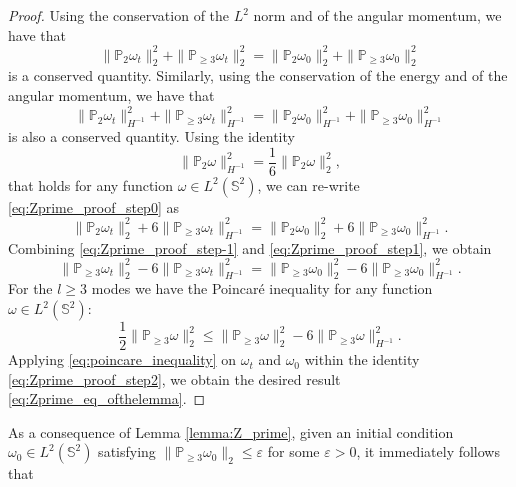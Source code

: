 \documentclass{amsart}
\def\esse{{\mathbb{S}}}
\begin{document}
\begin{proof}
    Using the conservation of the $L^2$ norm and of the angular momentum, we have that 
    \begin{equation}\label{eq:Zprime_proof_step-1}
        \|\mathbb{P}_2\omega_t\|_2^2+\|\mathbb{P}_{\geq3}\omega_t\|_2^2=\|\mathbb{P}_2\omega_0\|_2^2+\|\mathbb{P}_{\geq3}\omega_0\|_2^2
    \end{equation}
    is a conserved quantity.
    Similarly, using the conservation of the energy and of the angular momentum, we have that
    \begin{equation}\label{eq:Zprime_proof_step0}
        \|\mathbb{P}_2\omega_t\|^2_{H^{-1}}+\|\mathbb{P}_{\geq3}\omega_t\|^2_{H^{-1}}=\|\mathbb{P}_2\omega_0\|^2_{H^{-1}}+\|\mathbb{P}_{\geq3}\omega_0\|^2_{H^{-1}}
    \end{equation}
    is also a conserved quantity.
    Using the identity
    \begin{equation*}
        \|\mathbb{P}_2\omega\|^2_{H^{-1}}=\frac{1}{6}\|\mathbb{P}_2\omega\|_2^2,
    \end{equation*}
    that holds for any function $\omega\in L^2(\esse^2)$, we can re-write \eqref{eq:Zprime_proof_step0} as
    \begin{equation}\label{eq:Zprime_proof_step1}
        \|\mathbb{P}_2\omega_t\|_2^2+6\|\mathbb{P}_{\geq3}\omega_t\|^2_{H^{-1}}=\|\mathbb{P}_2\omega_0\|_2^2+6\|\mathbb{P}_{\geq3}\omega_0\|^2_{H^{-1}}.
    \end{equation}
    Combining \eqref{eq:Zprime_proof_step-1} and \eqref{eq:Zprime_proof_step1}, we obtain
    \begin{equation}\label{eq:Zprime_proof_step2}
        \|\mathbb{P}_{\geq3}\omega_t\|_2^2-6\|\mathbb{P}_{\geq3}\omega_t\|^2_{H^{-1}}=\|\mathbb{P}_{\geq3}\omega_0\|_2^2-6\|\mathbb{P}_{\geq3}\omega_0\|^2_{H^{-1}}.
    \end{equation}
    For the $l\geq3$ modes we have the Poincaré inequality for any function $\omega\in L^2(\esse^2)$:
    \begin{equation}\label{eq:poincare_inequality}
        \frac{1}{2}\|\mathbb{P}_{\geq3}\omega\|_2^2 \le \|\mathbb{P}_{\geq3}\omega\|_2^2-6\|\mathbb{P}_{\geq3}\omega\|^2_{H^{-1}}.
    \end{equation}
    Applying \eqref{eq:poincare_inequality} on $\omega_t$ and $\omega_0$ within the identity \eqref{eq:Zprime_proof_step2}, we obtain the desired result \eqref{eq:Zprime_eq_ofthelemma}.
\end{proof}
As a consequence of Lemma \ref{lemma:Z_prime}, given an initial condition $\omega_0\in L^2(\esse^2)$ satisfying $\|\mathbb{P}_{\geq3}\omega_0\|_2\leq\varepsilon$ for some $\varepsilon>0$, it immediately follows that
\end{document}
